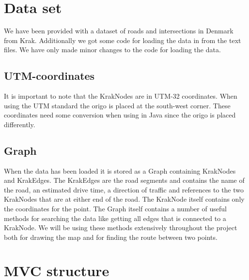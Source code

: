 \section{Data set}
\label{BG-DS}
We have been provided with a dataset of roads and intersections in Denmark 
from Krak. Additionally we got some code for loading the data in from the 
text files. We have only made minor changes to the code for loading the data.
\subsection{UTM-coordinates}
\label{BG-DS-UTM}
It is important to note that the KrakNodes are in UTM-32 coordinates. When 
using the UTM standard the origo is placed at the south-west corner. These 
coordinates need some conversion when using in Java since the origo is placed 
differently.
\subsection{Graph}
\label{BG-DS-G}
When the data has been loaded it is stored as a Graph containing KrakNodes 
and KrakEdges. The KrakEdges are the road segments and contains the name 
of the road, an estimated drive time, a direction of traffic and references 
to the two KrakNodes that are at either end of the road.  The KrakNode itself 
contains only the coordinates for the point.
The Graph itself contains a number of useful methods for searching the data 
like getting all edges that is connected to a KrakNode. We will be using these 
methods extensively throughout the project both for drawing the map and for 
finding the route between two points.
\section{MVC structure}
\label{BG-MVC}
